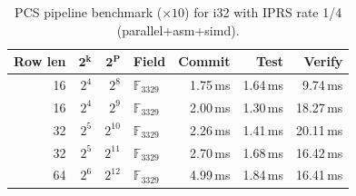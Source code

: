 \begin{table}[ht]
\centering
\caption{PCS pipeline benchmark ($\times10$) for i32 with IPRS rate 1/4 (parallel+asm+simd).}
\label{tab:pcs-pipeline-suite-i32}
\begin{tabular}{r r r l r r r}
\toprule
\textbf{Row len} & $\boldsymbol{2^k}$ & $\boldsymbol{2^P}$ & \textbf{Field} & \textbf{Commit} & \textbf{Test} & \textbf{Verify} \\
\midrule
     16 & $2^{4}$ & $2^{8}$ & $\mathbb{F}_{3329}$ & 1.75\,ms & 1.64\,ms & 9.74\,ms \\
     16 & $2^{4}$ & $2^{9}$ & $\mathbb{F}_{3329}$ & 2.00\,ms & 1.30\,ms & 18.27\,ms \\
     32 & $2^{5}$ & $2^{10}$ & $\mathbb{F}_{3329}$ & 2.26\,ms & 1.41\,ms & 20.11\,ms \\
     32 & $2^{5}$ & $2^{11}$ & $\mathbb{F}_{3329}$ & 2.70\,ms & 1.68\,ms & 16.42\,ms \\
     64 & $2^{6}$ & $2^{12}$ & $\mathbb{F}_{3329}$ & 4.99\,ms & 1.84\,ms & 16.41\,ms \\
\bottomrule
\end{tabular}
\end{table}
